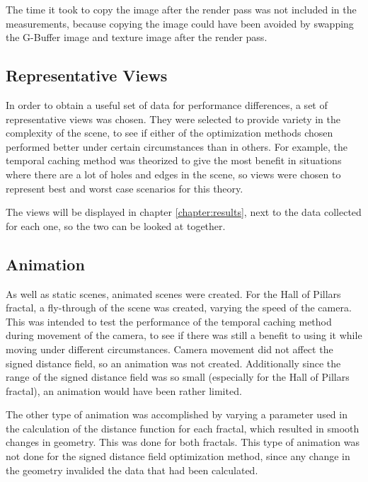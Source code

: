 The time it took to copy the image after the render pass was not included in the measurements, because copying the image could have been avoided by swapping the G-Buffer image and texture image after the render pass.

\subsection{Representative Views}

In order to obtain a useful set of data for performance differences, a set of representative views was chosen. They were selected to provide variety in the complexity of the scene, to see if either of the optimization methods chosen performed better under certain circumstances than in others. For example, the temporal caching method was theorized to give the most benefit in situations where there are a lot of holes and edges in the scene, so views were chosen to represent best and worst case scenarios for this theory.\newline

The views will be displayed in chapter \ref{chapter:results}, next to the data collected for each one, so the two can be looked at together.

\subsection{Animation}

As well as static scenes, animated scenes were created. For the Hall of Pillars fractal, a fly-through of the scene was created, varying the speed of the camera. This was intended to test the performance of the temporal caching method during movement of the camera, to see if there was still a benefit to using it while moving under different circumstances. Camera movement did not affect the signed distance field, so an animation was not created. Additionally since the range of the signed distance field was so small (especially for the Hall of Pillars fractal), an animation would have been rather limited.\newline

The other type of animation was accomplished by varying a parameter used in the calculation of the distance function for each fractal, which resulted in smooth changes in geometry. This was done for both fractals. This type of animation was not done for the signed distance field optimization method, since any change in the geometry invalided the data that had been calculated.

